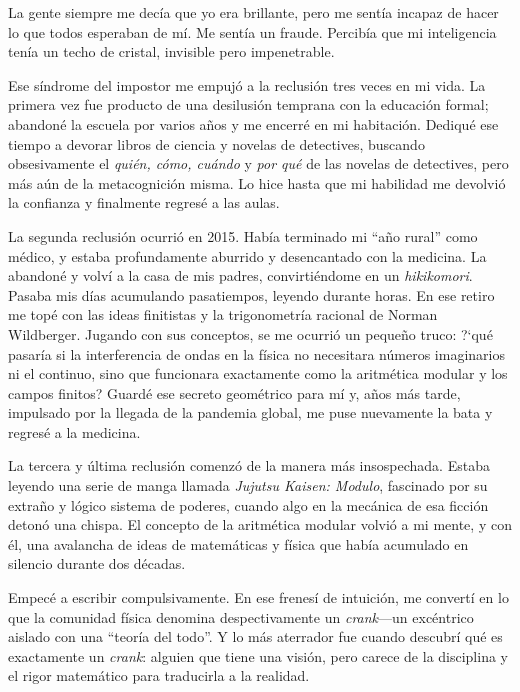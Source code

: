 \documentclass[11pt, a4paper, openany]{book}
\begin{document}
La gente siempre me dec\'ia que yo era brillante, pero me sent\'ia
incapaz de hacer lo que todos esperaban de m\'i. Me sent\'ia un fraude.
Percib\'ia que mi inteligencia ten\'ia un techo de cristal, invisible
pero impenetrable.

Ese s\'indrome del impostor me empuj\'o a la reclusi\'on tres veces en
mi vida. La primera vez fue producto de una desilusi\'on temprana con la
educaci\'on formal; abandon\'e la escuela por varios a\~nos y me
encerr\'e en mi habitaci\'on. Dediqu\'e ese tiempo a devorar libros de
ciencia y novelas de detectives, buscando obsesivamente el
\textit{qui\'en, c\'omo, cu\'ando} y \textit{por qu\'e} de las novelas de
detectives, pero m\'as a\'un de la metacognici\'on misma. Lo hice hasta
que mi habilidad me devolvi\'o la confianza y finalmente regres\'e a las
aulas.

La segunda reclusi\'on ocurri\'o en 2015. Hab\'ia terminado mi ``a\~no
rural'' como m\'edico, y estaba profundamente aburrido y desencantado
con la medicina. La abandon\'e y volv\'i a la casa de mis padres,
convirti\'endome en un \textit{hikikomori}. Pasaba mis d\'ias acumulando
pasatiempos, leyendo durante horas. En ese retiro me top\'e con las
ideas finitistas y la trigonometr\'ia racional de Norman Wildberger.
Jugando con sus conceptos, se me ocurri\'o un peque\~no truco: ?`qu\'e
pasar\'ia si la interferencia de ondas en la f\'isica no necesitara
n\'umeros imaginarios ni el continuo, sino que funcionara exactamente
como la aritm\'etica modular y los campos finitos? Guard\'e ese secreto
geom\'etrico para m\'i y, a\~nos m\'as tarde, impulsado por la llegada
de la pandemia global, me puse nuevamente la bata y regres\'e a la
medicina.

La tercera y \'ultima reclusi\'on comenz\'o de la manera m\'as
insospechada. Estaba leyendo una serie de manga llamada \textit{Jujutsu
Kaisen: Modulo}, fascinado por su extra\~no y l\'ogico sistema de
poderes, cuando algo en la mec\'anica de esa ficci\'on deton\'o una
chispa. El concepto de la aritm\'etica modular volvi\'o a mi mente, y
con \'el, una avalancha de ideas de matem\'aticas y f\'isica que
hab\'ia acumulado en silencio durante dos d\'ecadas.

Empec\'e a escribir compulsivamente. En ese frenes\'i de intuici\'on, me
convert\'i en lo que la comunidad f\'isica denomina despectivamente un
\textit{crank}---un exc\'entrico aislado con una ``teor\'ia del todo''.
Y lo m\'as aterrador fue cuando descubr\'i qu\'e es exactamente un
\textit{crank}: alguien que tiene una visi\'on, pero carece de la
disciplina y el rigor matem\'atico para traducirla a la realidad.
\end{document}
